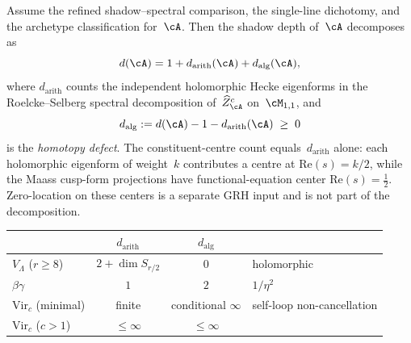 \begin{theorem}
\label{thm:depth-decomposition}
\ClaimStatusConditional
Assume the refined shadow--spectral comparison, the single-line
dichotomy, and the archetype classification for~$\cA$. Then the
shadow depth of~$\cA$ decomposes as
\begin{equation}\label{eq:depth-decomposition}
 d(\cA)
 = 1 + d_{\mathrm{arith}}(\cA) + d_{\mathrm{alg}}(\cA),
\end{equation}
where $d_{\mathrm{arith}}$ counts the independent holomorphic Hecke
eigenforms in the Roelcke--Selberg spectral decomposition
of~$\widehat{Z}^c_\cA$ on~$\cM_{1,1}$, and
\[
 d_{\mathrm{alg}}
 := d(\cA) - 1 - d_{\mathrm{arith}}(\cA)
 \;\ge\; 0
\]
is the \emph{homotopy defect}. The constituent-centre count
equals~$d_{\mathrm{arith}}$ alone: each holomorphic eigenform of
weight~$k$ contributes a centre at $\mathrm{Re}(s)=k/2$,
while the Maass cusp-form projections have functional-equation center
$\mathrm{Re}(s)=\tfrac12$. Zero-location on these centers is a
separate GRH input and is not part of the decomposition.

\begin{center}
\small
\renewcommand{\arraystretch}{1.2}
\begin{tabular}{lccl}
\toprule
& $d_{\mathrm{arith}}$ & $d_{\mathrm{alg}}$ & \\
\midrule
$V_\Lambda$ ($r\ge8$)
 & $2{+}\dim S_{r/2}$ & $0$ & holomorphic \\
$\beta\gamma$
 & $1$ & $2$ & $1/\eta^2$ \\
$\mathrm{Vir}_c$ (minimal)
 & finite & conditional $\infty$ & self-loop non-cancellation \\
$\mathrm{Vir}_c$ ($c>1$)
 & $\le\infty$ & $\le\infty$ & \\
\bottomrule
\end{tabular}
\end{center}
\end{theorem}


